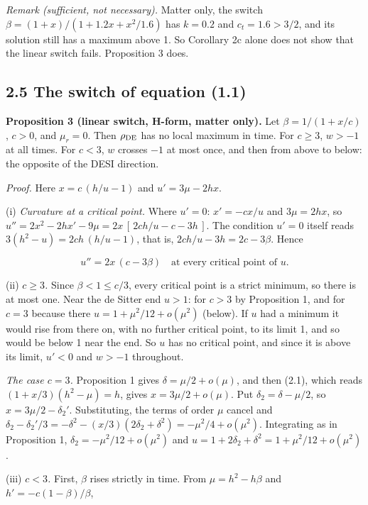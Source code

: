 \documentclass[11pt,a4paper]{article}
\begin{document}
\emph{Remark (sufficient, not necessary).} Matter only, the switch $\beta = (1 + x)/(1 + 1.2x + x^2/1.6)$ has $k = 0.2$ and
$c_t = 1.6 > 3/2$, and its solution still has a maximum above 1. So Corollary 2c alone does not show that the linear
switch fails. Proposition 3 does.


\subsection*{2.5 The switch of equation (1.1)}
{\bfseries\boldmath Proposition 3 (linear switch, H-form, matter only).} Let $\beta = 1/(1 + x/c)$, $c > 0$, and $\mu_r = 0$. Then
$\rho_{\rm DE}$ has no local maximum in time. For $c \ge 3$, $w > -1$ at all times. For $c < 3$, $w$ crosses $-1$ at
most once, and then from above to below: the opposite of the DESI direction.

\emph{Proof.} Here $x = c\,(h/u - 1)$ and $u' = 3\mu - 2hx$.

(i) \emph{Curvature at a critical point.} Where $u' = 0$: $x' = -cx/u$ and $3\mu = 2hx$, so
$u'' = 2x^2 - 2hx' - 9\mu = 2x\,[\,2ch/u - c - 3h\,]$. The condition $u' = 0$ itself reads
$3(h^2 - u) = 2ch\,(h/u - 1)$, that is, $2ch/u - 3h = 2c - 3\beta$. Hence


\begin{equation*}
u'' = 2x\,(c - 3\beta) \quad\text{at every critical point of } u. \tag{2.7}
\end{equation*}


(ii) \emph{$c \ge 3$.} Since $\beta < 1 \le c/3$, every critical point is a strict minimum, so there is at most one. Near
the de Sitter end $u > 1$: for $c > 3$ by Proposition 1, and for $c = 3$ because there
$u = 1 + \mu^2/12 + o(\mu^2)$ (below). If $u$ had a minimum it would rise from there on, with no further critical
point, to its limit 1, and so would be below 1 near the end. So $u$ has no critical point, and since it is above its
limit, $u' < 0$ and $w > -1$ throughout.

\emph{The case $c = 3$.} Proposition 1 gives $\delta = \mu/2 + o(\mu)$, and then (2.1), which reads
$(1 + x/3)(h^2 - \mu) = h$, gives $x = 3\mu/2 + o(\mu)$. Put $\delta_2 = \delta - \mu/2$, so $x = 3\mu/2 - \delta_2'$.
Substituting, the terms of order $\mu$ cancel and
$\delta_2 - \delta_2'/3 = -\delta^2 - (x/3)(2\delta_2 + \delta^2) = -\mu^2/4 + o(\mu^2)$. Integrating as in Proposition 1,
$\delta_2 = -\mu^2/12 + o(\mu^2)$ and $u = 1 + 2\delta_2 + \delta^2 = 1 + \mu^2/12 + o(\mu^2)$.

(iii) \emph{$c < 3$.} First, $\beta$ rises strictly in time. From $\mu = h^2 - h\beta$ and $h' = -c(1 - \beta)/\beta$,
\end{document}
